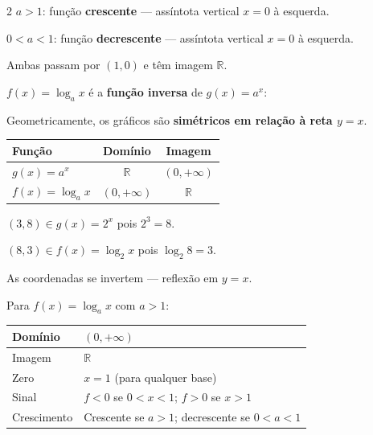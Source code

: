 \documentclass[12pt]{article}
\begin{document}
\begin{multicols}{2}
$a > 1$: função \textbf{crescente} — assíntota vertical $x = 0$ à esquerda.

$0 < a < 1$: função \textbf{decrescente} — assíntota vertical $x = 0$ à esquerda.

Ambas passam por $(1, 0)$ e têm imagem $\mathbb{R}$.


$f(x) = \log_a x$ é a \textbf{função inversa} de $g(x) = a^x$:


Geometricamente, os gráficos são \textbf{simétricos em relação à reta $y = x$}.


\vspace{0.2cm}
\begin{center}
\renewcommand{\arraystretch}{1.4}
\begin{tabular}{|l|c|c|}
\hline
Função & Domínio & Imagem \\
\hline
$g(x) = a^x$ & $\mathbb{R}$ & $(0,+\infty)$ \\
\hline
$f(x) = \log_a x$ & $(0,+\infty)$ & $\mathbb{R}$ \\
\hline
\end{tabular}
\end{center}


$(3, 8) \in g(x) = 2^x$ pois $2^3 = 8$.

$(8, 3) \in f(x) = \log_2 x$ pois $\log_2 8 = 3$.

As coordenadas se invertem — reflexão em $y = x$.


Para $f(x) = \log_a x$ com $a > 1$:

\vspace{0.2cm}
\begin{center}
\renewcommand{\arraystretch}{1.4}
\begin{tabular}{|l|l|}
\hline
Domínio & $(0, +\infty)$ \\
\hline
Imagem & $\mathbb{R}$ \\
\hline
Zero & $x = 1$ (para qualquer base) \\
\hline
Sinal & $f < 0$ se $0 < x < 1$; \; $f > 0$ se $x > 1$ \\
\hline
Crescimento & Crescente se $a > 1$; decrescente se $0<a<1$ \\
\hline
\end{tabular}
\end{center}


\end{multicols}
\end{document}
